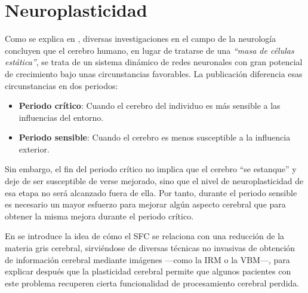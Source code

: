 






\section{Neuroplasticidad}
\label{neuroplasticidad}

Como se explica en \cite{Statement2012}, diversas investigaciones en el campo de la neurología concluyen que el cerebro humano, en lugar de tratarse de una \emph{``masa de células estática''}, se trata de un sistema dinámico de redes neuronales con gran potencial de crecimiento bajo unas circunstancias favorables. La publicación diferencia esas circunstancias en dos periodos:

\begin{itemize}
\item {\bf Periodo crítico}: Cuando el cerebro del individuo es más sensible a las influencias del entorno.
\item {\bf Periodo sensible}: Cuando el cerebro es menos susceptible a la influencia exterior.
\end{itemize}

Sin embargo, el fin del periodo crítico no implica que el cerebro ``se estanque'' y deje de ser susceptible de verse mejorado, sino que el nivel de neuroplasticidad de esa etapa no será alcanzado fuera de ella. Por tanto, durante el periodo sensible es necesario un mayor esfuerzo para mejorar algún aspecto cerebral que para obtener la misma mejora durante el periodo crítico.

En \cite{Facts2006} se introduce la idea de cómo el \ac{SFC} se relaciona con una reducción de la materia gris cerebral, sirviéndose de diversas técnicas no invasivas de obtención de información cerebral mediante imágenes ---como la \ac{IRM} o la \ac{VBM}---, para explicar después que la plasticidad cerebral permite que algunos pacientes con este problema recuperen cierta funcionalidad de procesamiento cerebral perdida.

